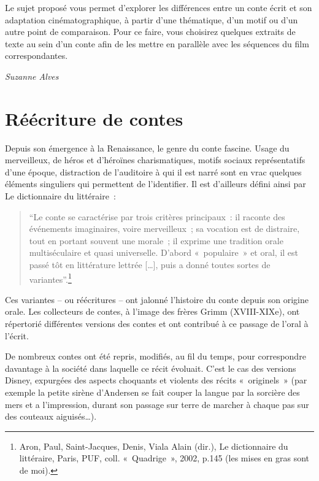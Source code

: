\documentclass[
  10pt,
  french,
  a5paper,
  openany]{book}
\newenvironment{signature}{\begin{flushright}}{\end{flushright}}
\begin{document}
\clearpage

Le sujet proposé vous permet d'explorer les différences entre un conte écrit et son adaptation cinématographique, à partir d'une thématique, d'un motif ou d'un autre point de comparaison. Pour ce faire, vous choisirez quelques extraits de texte au sein d'un conte afin de les mettre en parallèle avec les séquences du film correspondantes.

\begin{signature}
\emph{Suzanne Alves}

\end{signature}

\hypertarget{ruxe9uxe9criture-de-contes}{%
\chapter{Réécriture de contes}\label{ruxe9uxe9criture-de-contes}}

Depuis son émergence à la Renaissance, le genre du conte fascine. Usage du merveilleux, de héros et d'héroïnes charismatiques, motifs sociaux représentatifs d'une époque, distraction de l'auditoire à qui il est narré sont en vrac quelques éléments singuliers qui permettent de l'identifier. Il est d'ailleurs défini ainsi par Le dictionnaire du littéraire~:

\begin{quote}
``Le conte se caractérise par trois critères principaux~: il raconte des événements imaginaires, voire merveilleux~; sa vocation est de distraire, tout en portant souvent une morale~; il exprime une tradition orale multiséculaire et quasi universelle. D'abord «~populaire~» et oral, il est passé tôt en littérature lettrée {[}\ldots{]}, puis a donné toutes sortes de variantes''.\footnote{Aron, Paul, Saint-Jacques, Denis, Viala Alain (dir.), Le dictionnaire du littéraire, Paris, PUF, coll. «~Quadrige~», 2002, p.145 (les mises en gras sont de moi).}
\end{quote}

Ces variantes -- ou réécritures -- ont jalonné l'histoire du conte depuis son origine orale. Les collecteurs de contes, à l'image des frères Grimm (XVIII-XIXe), ont répertorié différentes versions des contes et ont contribué à ce passage de l'oral à l'écrit.

De nombreux contes ont été repris, modifiés, au fil du temps, pour correspondre davantage à la société dans laquelle ce récit évoluait. C'est le cas des versions Disney, expurgées des aspects choquants et violents des récits «~originels~» (par exemple la petite sirène d'Andersen se fait couper la langue par la sorcière des mers et a l'impression, durant son passage sur terre de marcher à chaque pas sur des couteaux aiguisés\ldots).
\end{document}
